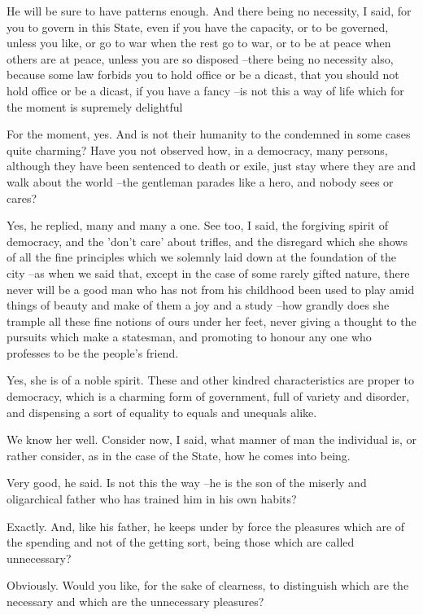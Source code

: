 He will be sure to have patterns enough.
And there being no necessity, I said, for you to govern in this State, even if you have the capacity, or to be governed, unless you like, or go to war when the rest go to war, or to be at peace when others are at peace, unless you are so disposed --there being no necessity also, because some law forbids you to hold office or be a dicast, that you should not hold office or be a dicast, if you have a fancy --is not this a way of life which for the moment is supremely delightful

For the moment, yes.
And is not their humanity to the condemned in some cases quite charming? Have you not observed how, in a democracy, many persons, although they have been sentenced to death or exile, just stay where they are and walk about the world --the gentleman parades like a hero, and nobody sees or cares?

Yes, he replied, many and many a one.
See too, I said, the forgiving spirit of democracy, and the 'don't care' about trifles, and the disregard which she shows of all the fine principles which we solemnly laid down at the foundation of the city --as when we said that, except in the case of some rarely gifted nature, there never will be a good man who has not from his childhood been used to play amid things of beauty and make of them a joy and a study --how grandly does she trample all these fine notions of ours under her feet, never giving a thought to the pursuits which make a statesman, and promoting to honour any one who professes to be the people's friend.

Yes, she is of a noble spirit.
These and other kindred characteristics are proper to democracy, which is a charming form of government, full of variety and disorder, and dispensing a sort of equality to equals and unequals alike.

We know her well.
Consider now, I said, what manner of man the individual is, or rather consider, as in the case of the State, how he comes into being.

Very good, he said.
Is not this the way --he is the son of the miserly and oligarchical father who has trained him in his own habits?

Exactly.
And, like his father, he keeps under by force the pleasures which are of the spending and not of the getting sort, being those which are called unnecessary?

Obviously.
Would you like, for the sake of clearness, to distinguish which are the necessary and which are the unnecessary pleasures?

